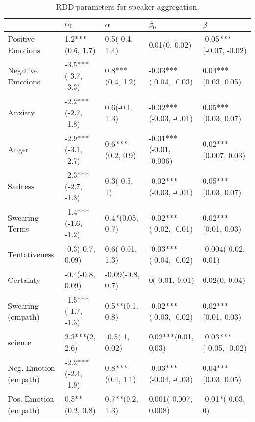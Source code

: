 \begin{table}[h]\centering
\begin{adjustbox}{width=\linewidth, center}
	\begin{tabular}{lllll}
	\toprule
	{} &           $\alpha_0$ &          $\alpha$ &                $\beta_0$ &                 $\beta$ \\
	\midrule
	Positive Emotions     &     1.2***(0.6, 1.7) &    0.5(-0.4, 1.4) &            0.01(0, 0.02) &  -0.05***(-0.07, -0.02) \\
	Negative Emotions     &  -3.5***(-3.7, -3.3) &  0.8***(0.4, 1.2) &   -0.03***(-0.04, -0.03) &     0.04***(0.03, 0.05) \\
	Anxiety               &  -2.2***(-2.7, -1.8) &    0.6(-0.1, 1.3) &   -0.02***(-0.03, -0.01) &     0.05***(0.03, 0.07) \\
	Anger                 &  -2.9***(-3.1, -2.7) &  0.6***(0.2, 0.9) &  -0.01***(-0.01, -0.006) &    0.02***(0.007, 0.03) \\
	Sadness               &  -2.3***(-2.7, -1.8) &      0.3(-0.5, 1) &   -0.02***(-0.03, -0.01) &     0.05***(0.03, 0.07) \\
	Swearing Terms        &  -1.4***(-1.6, -1.2) &   0.4*(0.05, 0.7) &   -0.02***(-0.02, -0.01) &     0.02***(0.01, 0.03) \\
	Tentativeness         &     -0.3(-0.7, 0.09) &   0.6(-0.01, 1.3) &   -0.03***(-0.04, -0.02) &     -0.004(-0.02, 0.01) \\
	Certainty             &     -0.4(-0.8, 0.09) &  -0.09(-0.8, 0.7) &           0(-0.01, 0.01) &           0.02(0, 0.04) \\
	Swearing (empath)     &  -1.5***(-1.7, -1.3) &   0.5**(0.1, 0.8) &   -0.02***(-0.03, -0.02) &     0.02***(0.01, 0.03) \\
	science               &       2.3***(2, 2.6) &    -0.5(-1, 0.02) &      0.02***(0.01, 0.03) &  -0.03***(-0.05, -0.02) \\
	Neg. Emotion (empath) &  -2.2***(-2.4, -1.9) &  0.8***(0.4, 1.1) &   -0.03***(-0.04, -0.03) &     0.04***(0.03, 0.05) \\
	Pos. Emotion (empath) &      0.5**(0.2, 0.8) &   0.7**(0.2, 1.3) &     0.001(-0.007, 0.008) &        -0.01*(-0.03, 0) \\
	\bottomrule
	\end{tabular}
	
\end{adjustbox}
	\caption{RDD parameters for speaker aggregation.}
	\label{fig: Speaker_1}
\end{table}


